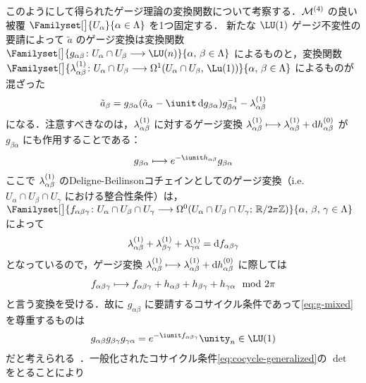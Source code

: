 \documentclass[TQFT_main]{subfiles}
\begin{document}
このようにして得られたゲージ理論の変換関数について考察する．$\mathcal{M}^{(4)}$ の良い被覆 $\Familyset[\big]{U_\alpha}{\alpha \in \Lambda}$ を1つ固定する．
新たな $\LU (1)$ ゲージ不変性の要請によって $\tilde{a}$ のゲージ変換は変換関数 $\Familyset[\big]{g_{\alpha\beta} \colon U_\alpha \cap U_\beta \lto \LU (n)}{\alpha,\, \beta \in \Lambda}$ によるものと，変換関数 $\Familyset[\big]{\hg{\lambda}{1}_{\alpha\beta} \colon U_\alpha \cap U_\beta \lto \Omega^1(U_\alpha \cap U_\beta,\, \Lu(1))}{\alpha,\, \beta \in \Lambda}$ によるものが混ざった
\begin{align}
    \tilde{a}_\beta = g_{\beta\alpha} (\tilde{a}_\alpha - \iunit \dd{g_{\beta\alpha}}) g_{\beta\alpha}^{-1} - \hg{\lambda}{1}_{\alpha\beta}
\end{align}
になる．注意すべきなのは，$\lambda^{(1)}_{\alpha\beta}$ に対するゲージ変換 $\lambda^{(1)}_{\alpha\beta} \longmapsto \lambda^{(1)}_{\alpha\beta} + \dd{h^{(0)}_{\alpha\beta}}$ が $g_{\beta\alpha}$ にも作用することである：
\begin{align}
    \label{eq:g-mixed}
    g_{\beta\alpha} \lmto e^{-\iunit h_{\alpha\beta}} g_{\beta\alpha}
\end{align}
ここで $\lambda^{(1)}_{\alpha\beta}$ のDeligne-Beilinsonコチェインとしてのゲージ変換（i.e. $U_\alpha \cap U_\beta \cap U_\gamma$ における整合性条件）は，$\Familyset[\big]{f_{\alpha\beta\gamma} \colon U_\alpha \cap U_\beta \cap U_\gamma \lto \Omega^0(U_\alpha \cap U_\beta \cap U_\gamma;\, \mathbb{R} / 2\pi \mathbb{Z})}{\alpha,\, \beta,\, \gamma \in \Lambda}$ によって
\begin{align}
    \lambda^{(1)}_{\alpha\beta} + \lambda^{(1)}_{\beta\gamma} + \lambda^{(1)}_{\gamma \alpha} = \dd{f_{\alpha\beta\gamma}}
\end{align}
となっているので，ゲージ変換 $\lambda^{(1)}_{\alpha\beta} \longmapsto \lambda^{(1)}_{\alpha\beta} + \dd{h^{(0)}_{\alpha\beta}}$ に際しては
\begin{align}
    f_{\alpha\beta\gamma} \longmapsto f_{\alpha\beta\gamma} + h_{\alpha\beta} + h_{\beta\gamma} + h_{\gamma\alpha} \mod 2\pi
\end{align}
と言う変換を受ける．故に $g_{\alpha\beta}$ に要請するコサイクル条件であって\eqref{eq:g-mixed}を尊重するものは
\begin{align}
    \label{eq:cocycle-generalized}
    g_{\alpha\beta} g_{\beta\gamma} g_{\gamma\alpha} = e^{-\iunit f_{\alpha\beta\gamma}} \unity_n \in \LU(1)
\end{align}
だと考えられる~\cite[p.28]{KapustinSeiberg2014}．一般化されたコサイクル条件\eqref{eq:cocycle-generalized}の $\det$ をとることにより
\end{document}
